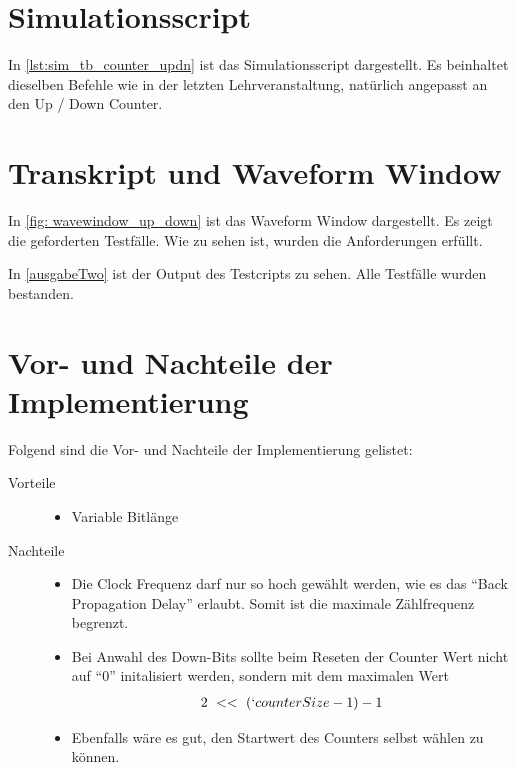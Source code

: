 \documentclass[./\jobname.tex]{subfiles}
\begin{document}
\section{Simulationsscript}
%
In \autoref{lst:sim_tb_counter_updn} ist das Simulationsscript dargestellt. Es beinhaltet dieselben Befehle wie in der letzten Lehrveranstaltung, natürlich angepasst an den Up / Down Counter.
%

%
\section{Transkript und Waveform Window}
%
In \autoref{fig: wavewindow_up_down} ist das Waveform Window dargestellt. Es zeigt die geforderten Testfälle. Wie zu sehen ist, wurden die Anforderungen erfüllt.
%
\begin{figure}[H]
	\centering
	\noindent{}
	\label{fig: wavewindow_up_down}
\end{figure}
%
In \autoref{ausgabeTwo} ist der Output des Testcripts zu sehen. Alle Testfälle wurden bestanden.
%

%
\section{Vor- und Nachteile der Implementierung}
%
Folgend sind die Vor- und Nachteile der Implementierung gelistet:
%
\begin{description}
	\item[Vorteile] \hfil
	\begin{itemize}
		\item Variable Bitlänge
	\end{itemize}
	\item[Nachteile] \hfil
	\begin{itemize}
		\item Die Clock Frequenz darf nur so hoch gewählt werden, wie es das \enquote{Back Propagation Delay} erlaubt. Somit ist die maximale Zählfrequenz begrenzt.
		\item Bei Anwahl des Down-Bits sollte beim Reseten der Counter Wert nicht auf \enquote{0} initalisiert werden, sondern mit dem maximalen Wert
		\begin{align}
		2~<<~ (`counterSize-1) - 1
		\end{align}
		\item Ebenfalls wäre es gut, den Startwert des Counters selbst wählen zu können.
	\end{itemize}
\end{description}
%
\end{document}
